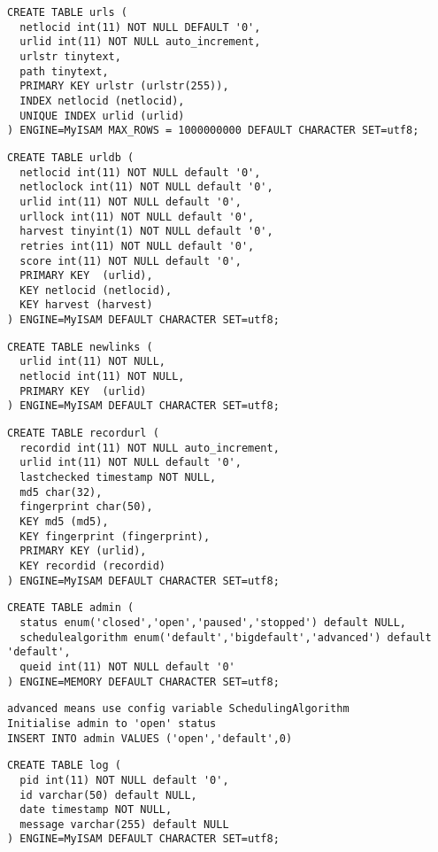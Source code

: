 \begin{verbatim}
CREATE TABLE urls (
  netlocid int(11) NOT NULL DEFAULT '0',
  urlid int(11) NOT NULL auto_increment,
  urlstr tinytext,
  path tinytext,
  PRIMARY KEY urlstr (urlstr(255)),
  INDEX netlocid (netlocid),
  UNIQUE INDEX urlid (urlid)
) ENGINE=MyISAM MAX_ROWS = 1000000000 DEFAULT CHARACTER SET=utf8;
\end{verbatim}

\begin{verbatim}
CREATE TABLE urldb (
  netlocid int(11) NOT NULL default '0',
  netloclock int(11) NOT NULL default '0',
  urlid int(11) NOT NULL default '0',
  urllock int(11) NOT NULL default '0',
  harvest tinyint(1) NOT NULL default '0',
  retries int(11) NOT NULL default '0',
  score int(11) NOT NULL default '0',
  PRIMARY KEY  (urlid),
  KEY netlocid (netlocid),
  KEY harvest (harvest)
) ENGINE=MyISAM DEFAULT CHARACTER SET=utf8;
\end{verbatim}

\begin{verbatim}
CREATE TABLE newlinks (
  urlid int(11) NOT NULL,
  netlocid int(11) NOT NULL,
  PRIMARY KEY  (urlid)
) ENGINE=MyISAM DEFAULT CHARACTER SET=utf8;
\end{verbatim}

\begin{verbatim}
CREATE TABLE recordurl (
  recordid int(11) NOT NULL auto_increment,
  urlid int(11) NOT NULL default '0',
  lastchecked timestamp NOT NULL,
  md5 char(32),
  fingerprint char(50),
  KEY md5 (md5),
  KEY fingerprint (fingerprint),
  PRIMARY KEY (urlid),
  KEY recordid (recordid)
) ENGINE=MyISAM DEFAULT CHARACTER SET=utf8;
\end{verbatim}

\begin{verbatim}
CREATE TABLE admin (
  status enum('closed','open','paused','stopped') default NULL,
  schedulealgorithm enum('default','bigdefault','advanced') default 'default',
  queid int(11) NOT NULL default '0'
) ENGINE=MEMORY DEFAULT CHARACTER SET=utf8;
\end{verbatim}

\verb+advanced means use config variable SchedulingAlgorithm+\\
\verb+Initialise admin to 'open' status+\\
\verb+INSERT INTO admin VALUES ('open','default',0)+\\
\begin{verbatim}
CREATE TABLE log (
  pid int(11) NOT NULL default '0',
  id varchar(50) default NULL,
  date timestamp NOT NULL,
  message varchar(255) default NULL
) ENGINE=MyISAM DEFAULT CHARACTER SET=utf8;
\end{verbatim}

